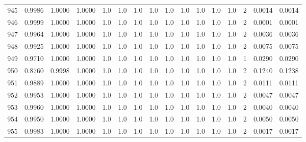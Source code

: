 \begin{tabular}{lrrrrrrrrrrrrrrr}
945 &      0.9986 &  1.0000 &  1.0000 &     1.0 &     1.0 &     1.0 &     1.0 &     1.0 &     1.0 &     1.0 &      1.0 &        1.0 &      2 &                    0.0014 &                     0.0014 \\
946 &      0.9999 &  1.0000 &  1.0000 &     1.0 &     1.0 &     1.0 &     1.0 &     1.0 &     1.0 &     1.0 &      1.0 &        1.0 &      2 &                    0.0001 &                     0.0001 \\
947 &      0.9964 &  1.0000 &  1.0000 &     1.0 &     1.0 &     1.0 &     1.0 &     1.0 &     1.0 &     1.0 &      1.0 &        1.0 &      2 &                    0.0036 &                     0.0036 \\
948 &      0.9925 &  1.0000 &  1.0000 &     1.0 &     1.0 &     1.0 &     1.0 &     1.0 &     1.0 &     1.0 &      1.0 &        1.0 &      2 &                    0.0075 &                     0.0075 \\
949 &      0.9710 &  1.0000 &  1.0000 &     1.0 &     1.0 &     1.0 &     1.0 &     1.0 &     1.0 &     1.0 &      1.0 &        1.0 &      1 &                    0.0290 &                     0.0290 \\
950 &      0.8760 &  0.9998 &  1.0000 &     1.0 &     1.0 &     1.0 &     1.0 &     1.0 &     1.0 &     1.0 &      1.0 &        1.0 &      2 &                    0.1240 &                     0.1238 \\
951 &      0.9889 &  1.0000 &  1.0000 &     1.0 &     1.0 &     1.0 &     1.0 &     1.0 &     1.0 &     1.0 &      1.0 &        1.0 &      2 &                    0.0111 &                     0.0111 \\
952 &      0.9953 &  1.0000 &  1.0000 &     1.0 &     1.0 &     1.0 &     1.0 &     1.0 &     1.0 &     1.0 &      1.0 &        1.0 &      2 &                    0.0047 &                     0.0047 \\
953 &      0.9960 &  1.0000 &  1.0000 &     1.0 &     1.0 &     1.0 &     1.0 &     1.0 &     1.0 &     1.0 &      1.0 &        1.0 &      2 &                    0.0040 &                     0.0040 \\
954 &      0.9950 &  1.0000 &  1.0000 &     1.0 &     1.0 &     1.0 &     1.0 &     1.0 &     1.0 &     1.0 &      1.0 &        1.0 &      2 &                    0.0050 &                     0.0050 \\
955 &      0.9983 &  1.0000 &  1.0000 &     1.0 &     1.0 &     1.0 &     1.0 &     1.0 &     1.0 &     1.0 &      1.0 &        1.0 &      2 &                    0.0017 &                     0.0017 \\

\end{tabular}
